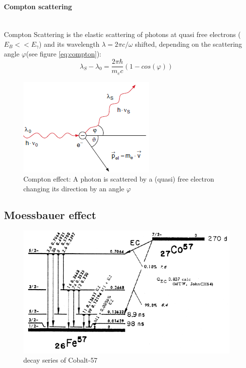 \paragraph{Compton scattering} \ \\
Compton Scattering is the elastic scattering of photons at quasi free  electrons ($E_B << E_\gamma$) and its wavelength $\lambda=2\pi c/\omega$ shifted, depending on the scattering angle $\varphi$(see figure \ref*{eq:compton}):
\begin{equation}
\lambda_S -\lambda_0 = \frac{2 \pi \hbar}{m_e c}(1-cos(\varphi))
\label{eq:compton}
\end{equation}
\begin{figure}[h]
\centering
\includegraphics[width=0.5\linewidth]{graphics/Compton}
\caption{Compton effect: A photon is scattered by a (quasi) free electron changing its direction by an angle $\varphi$ }
\label{fig:principles:Compton}
\end{figure}

\subsection{Moessbauer effect}


\begin{figure}[hb]
	\centering
	\includegraphics[width=1.0\linewidth]{graphics/Zerfallsschema}
	\caption[Co-57 decay]{decay series of Cobalt-57}
	\label{fig:principles:Zerfallsschema}
\end{figure}